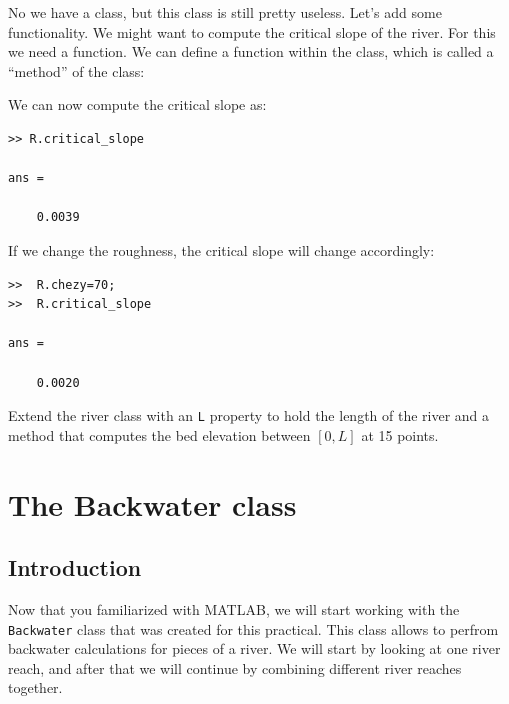 \documentclass[a4paper]{article}
\begin{document}
No we have a class, but this class is still pretty useless. Let's add some functionality. We might want to compute the critical slope of the river. For this we need a function. We can define a function within the class, which is called a ``method'' of the class:


We can now compute the critical slope as:
\begin{lstlisting}
>> R.critical_slope

ans =

    0.0039

\end{lstlisting}
If we change the roughness, the critical slope will change accordingly:
\begin{lstlisting}
>>  R.chezy=70;
>>  R.critical_slope

ans =

    0.0020

\end{lstlisting}

\begin{exercise}
  Extend the river class with an \lstinline=L= property to hold the length of the river and a method that computes the bed elevation between $[0, L]$ at 15 points.
\end{exercise}

\section{The Backwater class}
\label{sec:backwater_class}

\subsection{Introduction}
Now that you familiarized with MATLAB, we will start working with the \lstinline=Backwater= class that was created for this practical. This class allows to perfrom backwater calculations for pieces of a river. We will start by looking at one river reach, and after that we will continue by combining different river reaches together.
\end{document}
